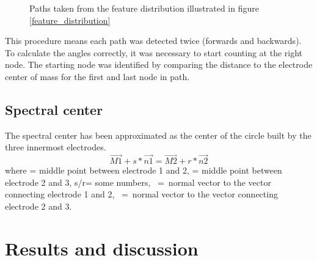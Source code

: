 \documentclass[a4paper, 10pt, twocolumn]{article}
\begin{document}
\begin{figure}[t]
\begin{subfigure}[c]{0.32\textwidth}
\end{subfigure}
\caption{Paths taken from the feature distribution illustrated in figure \ref{feature_distribution}}
\label{graphs}
\end{figure}
This procedure means each path was detected twice (forwards and backwards). To calculate the angles correctly, it was necessary to start counting at the right node. The starting node was identified by comparing the distance to the electrode center of mass for the first and last node in path.

\subsection{Spectral center}
The spectral center has been approximated as the center of the circle built by the three innermost electrodes\cite{spectral_center}.
$$\overrightarrow{M1}+s*\overrightarrow{n1}=\overrightarrow{M2}+r*\overrightarrow{n2}$$where  = middle point between electrode 1 and 2,  = middle point between electrode 2 and 3, s/r= some numbers, \ =\ normal vector to the vector connecting electrode 1 and 2, \ =\ normal vector to the vector connecting electrode 2 and 3.


\section{Results and discussion}
\end{document}
